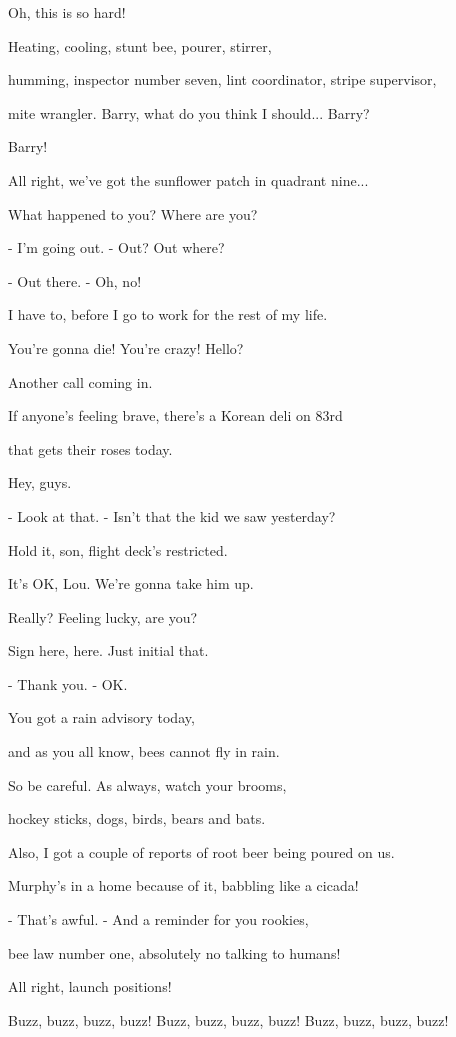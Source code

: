\documentclass[journal]{IEEEtran}
\begin{document}
  
Oh, this is so hard!

  
Heating, cooling,
stunt bee, pourer, stirrer,

  
humming, inspector number seven,
lint coordinator, stripe supervisor,

  
mite wrangler. Barry, what
do you think I should... Barry?

  
Barry!

  
All right, we've got the sunflower patch
in quadrant nine...

  
What happened to you?
Where are you?

  
- I'm going out.
- Out? Out where?

  
- Out there.
- Oh, no!

  
I have to, before I go
to work for the rest of my life.

  
You're gonna die! You're crazy! Hello?

  
Another call coming in.

  
If anyone's feeling brave,
there's a Korean deli on 83rd

  
that gets their roses today.

  
Hey, guys.

  
- Look at that.
- Isn't that the kid we saw yesterday?

  
Hold it, son, flight deck's restricted.

  
It's OK, Lou. We're gonna take him up.

  
Really? Feeling lucky, are you?

  
Sign here, here. Just initial that.

  
- Thank you.
- OK.

  
You got a rain advisory today,

  
and as you all know,
bees cannot fly in rain.

  
So be careful. As always,
watch your brooms,

  
hockey sticks, dogs,
birds, bears and bats.

  
Also, I got a couple of reports
of root beer being poured on us.

  
Murphy's in a home because of it,
babbling like a cicada!

  
- That's awful.
- And a reminder for you rookies,

  
bee law number one,
absolutely no talking to humans!

  
All right, launch positions!

  
Buzz, buzz, buzz, buzz! Buzz, buzz,
buzz, buzz! Buzz, buzz, buzz, buzz!
\end{document}
